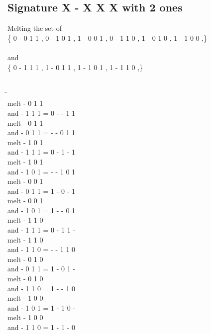 \documentclass{article}
\begin{document}
\subsection{Signature X - X X X with 2 ones}
Melting the set of\\
\{ 0  -  0  1  1 , 0  -  1  0  1 , 1  -  0  0  1 , 0  -  1  1  0 , 1  -  0  1  0 , 1  -  1  0  0 ,\}\\\\
and\\
\{ 0  -  1  1  1 , 1  -  0  1  1 , 1  -  1  0  1 , 1  -  1  1  0 ,\}\\\\
\begin{tabbing}
\hspace{3cm}\=\hspace{3cm}\=\hspace{3cm}\\[1cm]
melt  -  0  1  1 \\
and  -  1  1  1 \>
 =  0  -  -  1  1 \\[1mm]
melt  -  0  1  1 \\
and  -  0  1  1 \>
 =  -  -  0  1  1 \\[1mm]
melt  -  1  0  1 \\
and  -  1  1  1 \>
 =  0  -  1  -  1 \\[1mm]
melt  -  1  0  1 \\
and  -  1  0  1 \>
 =  -  -  1  0  1 \\[1mm]
melt  -  0  0  1 \\
and  -  0  1  1 \>
 =  1  -  0  -  1 \\[1mm]
melt  -  0  0  1 \\
and  -  1  0  1 \>
 =  1  -  -  0  1 \\[1mm]
melt  -  1  1  0 \\
and  -  1  1  1 \>
 =  0  -  1  1  - \\[1mm]
melt  -  1  1  0 \\
and  -  1  1  0 \>
 =  -  -  1  1  0 \\[1mm]
melt  -  0  1  0 \\
and  -  0  1  1 \>
 =  1  -  0  1  - \\[1mm]
melt  -  0  1  0 \\
and  -  1  1  0 \>
 =  1  -  -  1  0 \\[1mm]
melt  -  1  0  0 \\
and  -  1  0  1 \>
 =  1  -  1  0  - \\[1mm]
melt  -  1  0  0 \\
and  -  1  1  0 \>
 =  1  -  1  -  0 \\[1mm]
\end{tabbing}
\newpage
\end{document}
